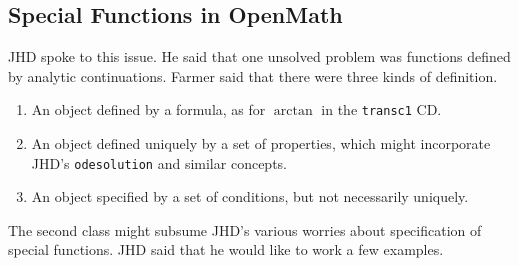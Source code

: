 \documentclass[11pt, a4paper]{article}
\begin{document}
\subsection{Special Functions in OpenMath}
JHD spoke to this issue. He said that one unsolved problem was functions
defined by analytic continuations. Farmer said that there were three kinds
of definition.
\begin{enumerate}
\item An object defined by a formula, as for $\arctan$ in the
\verb+transc1+ CD.
\item An object defined uniquely by a set of properties, which might
incorporate JHD's \verb+odesolution+ and similar concepts.
\item An object specified by a set of conditions, but not necessarily
uniquely.
\end{enumerate}
The second class might subsume JHD's various worries about specification of
special functions. JHD said that he would like to work a few examples.
\end{document}
